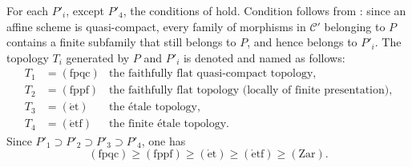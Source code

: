 For each \(P'_i\), except \(P'_4\), the conditions of 
hold. Condition  follows from : since an affine scheme is
quasi-compact, every family of morphisms in \(\mathscr C'\) belonging to
\(P\) contains a finite subfamily that still belongs to \(P\), and hence
belongs to \(P'_i\). The topology \(T_i\) generated by
\(P\) and \(P'_i\) is denoted and named as follows:
\[
\begin{array}{ccl}
 T_1&=(\mathrm{fpqc})&
   \text{the faithfully flat quasi-compact topology},\\
 T_2&=(\mathrm{fppf})&
   \text{the faithfully flat topology (locally of finite presentation)},\\
 T_3&=(\mathrm{\acute et})&
   \text{the \'{e}tale topology},\\
 T_4&=(\mathrm{\acute etf})&
   \text{the finite \'{e}tale topology}.
\end{array}
\]
Since \(P'_1\supset P'_2\supset P'_3\supset P'_4\), one has
\[
  (\mathrm{fpqc})\geq(\mathrm{fppf})\geq(\mathrm{\acute et})
  \geq(\mathrm{\acute etf})\geq(\mathrm{Zar}).
\]


